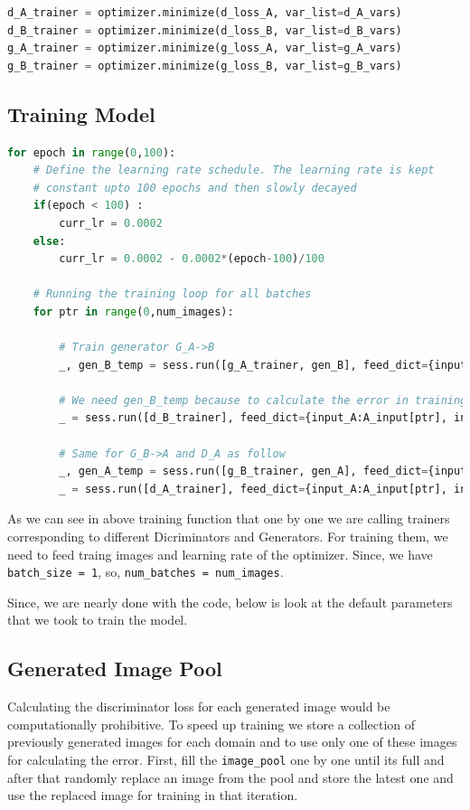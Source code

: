 \documentclass[peerreview]{IEEEtran}
\begin{document}
\begin{lstlisting}[language=Python]
d_A_trainer = optimizer.minimize(d_loss_A, var_list=d_A_vars)
d_B_trainer = optimizer.minimize(d_loss_B, var_list=d_B_vars)
g_A_trainer = optimizer.minimize(g_loss_A, var_list=g_A_vars)
g_B_trainer = optimizer.minimize(g_loss_B, var_list=g_B_vars)
\end{lstlisting}

\subsection{Training Model}

\begin{lstlisting}[language=Python]
for epoch in range(0,100):
    # Define the learning rate schedule. The learning rate is kept
    # constant upto 100 epochs and then slowly decayed
    if(epoch < 100) :
        curr_lr = 0.0002
    else:
        curr_lr = 0.0002 - 0.0002*(epoch-100)/100

    # Running the training loop for all batches
    for ptr in range(0,num_images):

        # Train generator G_A->B
        _, gen_B_temp = sess.run([g_A_trainer, gen_B], feed_dict={input_A:A_input[ptr], input_B:B_input[ptr], lr:curr_lr})

        # We need gen_B_temp because to calculate the error in training D_B
        _ = sess.run([d_B_trainer], feed_dict={input_A:A_input[ptr], input_B:B_input[ptr], lr:curr_lr})

        # Same for G_B->A and D_A as follow
        _, gen_A_temp = sess.run([g_B_trainer, gen_A], feed_dict={input_A:A_input[ptr], input_B:B_input[ptr], lr:curr_lr})
        _ = sess.run([d_A_trainer], feed_dict={input_A:A_input[ptr], input_B:B_input[ptr], lr:curr_lr})
\end{lstlisting}

As we can see in above training function that one by one we are calling trainers corresponding to different Dicriminators and Generators. For training them, we need to feed traing images and learning rate of the optimizer. Since, we have \verb!batch_size = 1!, so, \verb!num_batches = num_images!.

Since, we are nearly done with the code, below is look at the default parameters that we took to train the model.

\subsection*{Generated Image Pool} \label{gip}
Calculating the discriminator loss for each generated image would be computationally prohibitive. To speed up training we store a collection of previously generated images for each domain and to use only one of these images for calculating the error. First, fill the \verb!image_pool! one by one until its full and after that randomly replace an image from the pool and store the latest one and use the replaced image for training in that iteration.
\end{document}
